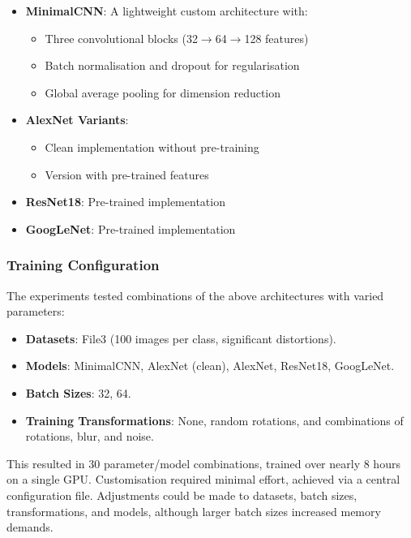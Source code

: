 \documentclass[conference]{IEEEtran}
\begin{document}
\begin{itemize}
    \item \textbf{MinimalCNN}: A lightweight custom architecture with:
    \begin{itemize}
        \item Three convolutional blocks (32$\rightarrow$64$\rightarrow$128 features)
        \item Batch normalisation and dropout for regularisation
        \item Global average pooling for dimension reduction
    \end{itemize}
    
    \item \textbf{AlexNet Variants}:
    \begin{itemize}
        \item Clean implementation without pre-training
        \item Version with pre-trained features
    \end{itemize}
    
    \item \textbf{ResNet18}: Pre-trained implementation
    \item \textbf{GoogLeNet}: Pre-trained implementation
\end{itemize}

\subsubsection{Training Configuration}

The experiments tested combinations of the above architectures with varied parameters:

\begin{itemize}
  \item \textbf{Datasets}: File3 (100 images per class, significant distortions).
  \item \textbf{Models}: MinimalCNN, AlexNet (clean), AlexNet, ResNet18, GoogLeNet.
  \item \textbf{Batch Sizes}: 32, 64.
  \item \textbf{Training Transformations}: None, random rotations, and combinations of rotations, blur, and noise.
\end{itemize}

This resulted in 30 parameter/model combinations, trained over nearly 8 hours on a single GPU. Customisation required
minimal effort, achieved via a central configuration file. Adjustments could be made to datasets, batch sizes,
transformations, and models, although larger batch sizes increased memory demands.
\end{document}
